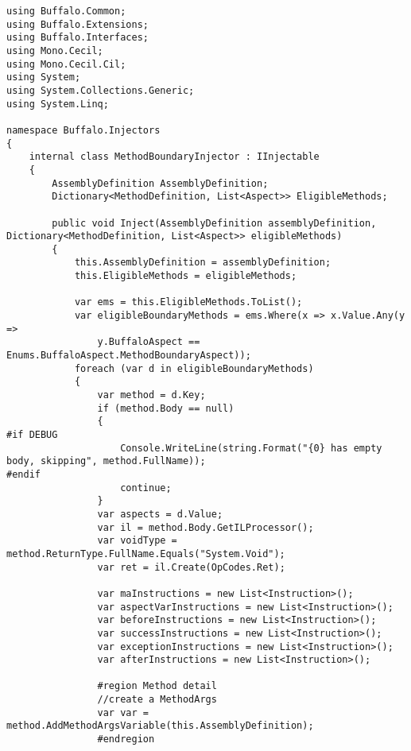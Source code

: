 \begin{lstlisting}[caption={../buffalo/Injectors/MethodBoundaryInjector.cs}, label=../buffalo/Injectors/MethodBoundaryInjector.cs, frame=tb, basicstyle=\scriptsize]﻿using Buffalo.Common;
using Buffalo.Extensions;
using Buffalo.Interfaces;
using Mono.Cecil;
using Mono.Cecil.Cil;
using System;
using System.Collections.Generic;
using System.Linq;

namespace Buffalo.Injectors
{
    internal class MethodBoundaryInjector : IInjectable
    {
        AssemblyDefinition AssemblyDefinition;
        Dictionary<MethodDefinition, List<Aspect>> EligibleMethods;

        public void Inject(AssemblyDefinition assemblyDefinition, Dictionary<MethodDefinition, List<Aspect>> eligibleMethods)
        {
            this.AssemblyDefinition = assemblyDefinition;
            this.EligibleMethods = eligibleMethods;

            var ems = this.EligibleMethods.ToList();
            var eligibleBoundaryMethods = ems.Where(x => x.Value.Any(y =>
                y.BuffaloAspect == Enums.BuffaloAspect.MethodBoundaryAspect));
            foreach (var d in eligibleBoundaryMethods)
            {
                var method = d.Key;
                if (method.Body == null)
                {
#if DEBUG
                    Console.WriteLine(string.Format("{0} has empty body, skipping", method.FullName));
#endif
                    continue;
                }
                var aspects = d.Value;
                var il = method.Body.GetILProcessor();
                var voidType = method.ReturnType.FullName.Equals("System.Void");
                var ret = il.Create(OpCodes.Ret);

                var maInstructions = new List<Instruction>();
                var aspectVarInstructions = new List<Instruction>();
                var beforeInstructions = new List<Instruction>();
                var successInstructions = new List<Instruction>();
                var exceptionInstructions = new List<Instruction>();
                var afterInstructions = new List<Instruction>();

                #region Method detail
                //create a MethodArgs
                var var = method.AddMethodArgsVariable(this.AssemblyDefinition);
                #endregion


\end{lstlisting}
